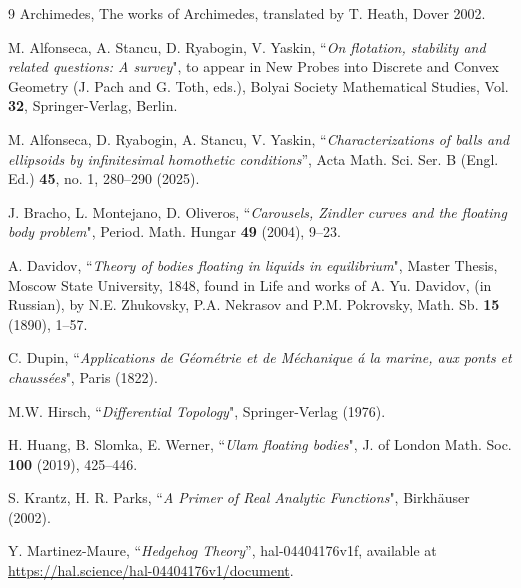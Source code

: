 \documentclass[12pt,letterpaper,reqno]{amsart}
\begin{document}
\begin{thebibliography}{9}
Archimedes, The works of Archimedes, translated by T. Heath, Dover 2002.


M. Alfonseca, A. Stancu, D. Ryabogin, V. Yaskin, ``\textit{On flotation, stability and related questions: A survey}", to appear in New Probes into Discrete and Convex Geometry (J. Pach and G. Toth, eds.), Bolyai Society Mathematical Studies, Vol. \textbf{32}, Springer-Verlag, Berlin.

M. Alfonseca, D. Ryabogin, A. Stancu, V. Yaskin, ``\textit{Characterizations of balls and ellipsoids by infinitesimal homothetic conditions}'', Acta Math. Sci. Ser. B (Engl. Ed.) \textbf{45},  no. 1, 280--290 (2025).

J. Bracho, L. Montejano, D. Oliveros, ``\textit{Carousels, Zindler curves and the floating body problem}", Period. Math. Hungar \textbf{49} (2004), 9–23.


A. Davidov, ``\textit{Theory of bodies floating in liquids in equilibrium}", Master Thesis, Moscow State University, 1848, found in Life and works of A. Yu. Davidov, (in Russian), by N.E. Zhukovsky,
P.A. Nekrasov and P.M. Pokrovsky, Math. Sb. \textbf{15} (1890), 1--57.

C. Dupin, ``\textit{Applications de G\'eom\'etrie et de M\'echanique \'a la marine, aux ponts et chaussées}", Paris (1822).

M.W. Hirsch, ``\textit{Differential Topology}", Springer-Verlag (1976).

H. Huang, B. Slomka, E. Werner, ``\textit{Ulam floating bodies}", J. of London Math. Soc. \textbf{100} (2019), 425--446.

S. Krantz, H. R. Parks, ``\textit{A Primer of Real Analytic Functions}", Birkhäuser (2002).

 Y. Martinez-Maure, ``\textit{Hedgehog Theory}'', hal-04404176v1f, available at \href{https://hal.science/hal-04404176v1/document}{https://hal.science/hal-04404176v1/document}.


\end{thebibliography}
\end{document}
